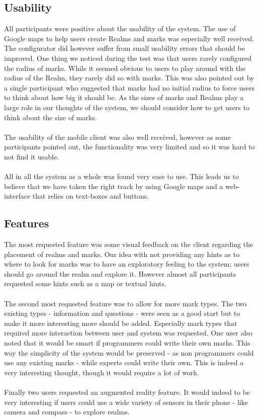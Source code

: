\subsection{Usability} %
\label{sub:usability}
All participants were positive about the usability of the system. The use of Google maps to help users create Realms and marks was especially well received. The configurator did however suffer from small usability errors that should be improved. One thing we noticed during the test was that users rarely configured the radius of marks. While it seemed obvious to users to play around with the radius of the Realm, they rarely did so with marks. This was also pointed out by a single participant who suggested that marks had no initial radius to force users to think about how big it should be. As the sizes of marks and Realms play a large role in our thoughts of the system, we should consider how to get users to think about the size of marks.
\\\\
The usability of the mobile client was also well received, however as some participants pointed out, the functionality was very limited and so it was hard to not find it usable.
\\\\
All in all the system as a whole was found very ease to use. This leads us to believe that we have taken the right track by using Google maps and a web-interface that relies on text-boxes and buttons.

\subsection{Features} %
\label{sub:features}
The most requested feature was some visual feedback on the client regarding the placement of realms and marks. Our idea with not providing any hints as to where to look for marks was to have an exploratory feeling to the system; users should go around the realm and explore it. However almost all participants requested some hints such as a map or textual hints.  
\\\\
The second most requested feature was to allow for more mark types. The two existing types - information and questions - were seen as a good start but to make it more interesting more should be added. Especially mark types that required more interaction between user and system was requested. One user also noted that it would be smart if programmers could write their own marks. This way the simplicity of the system would be preserved - as non programmers could use any existing marks - while experts could write their own. This is indeed a very interesting thought, though it would require a lot of work.
\\\\
Finally two users requested an augmented reality feature. It would indeed to be very interesting if users could use a wide variety of sensors in their phone - like camera and compass - to explore realms.

